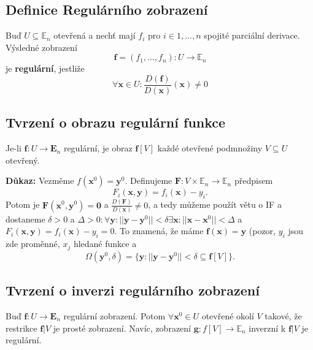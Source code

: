 \documentclass[10pt]{article}
\begin{document}
\subsection{Definice Regulárního zobrazení}
\hspace{1.2mm}
\noindent
Buď $U \subseteq \mathbb{E}_n$ otevřená a nechť mají $f_i$ pro $i \in {1, ... , n}$
spojité parciální derivace. Výsledné zobrazení
\[ \mathbf{f} = (f_1, ... , f_n): U \to \mathbb{E}_n \]
je \textbf{regulární}, jestliže
\[ \forall \mathbf{x} \in U: \frac{D(\mathbf{f})}{D(\mathbf{x})}(\mathbf{x}) \neq 0 \]


\subsection{Tvrzení o obrazu regulární funkce}
\hspace{1.2mm}
\noindent
Je-li $\mathbf{f}: U \to \mathbf{E}_n$ regulární, je obraz $\mathbf{f}[V]$ každé otevřené podmnožiny
$V \subseteq U$ otevřený.

\vspace{5mm}
\noindent
\textbf{Důkaz:} Vezměme $f(\textbf{x}^0) = \textbf{y}^0.$ Definujeme $\textbf{F} : V \times \mathbb{E}_n \rightarrow \mathbb{E}_n$ předpisem
\[F_i(\textbf{x},\textbf{y}) = f_i(\textbf{x}) - y_i.\]
Potom je $\textbf{F}(\textbf{x}^0,\textbf{y}^0) = \textbf{0}$
a $\frac{D(\textbf{F})}{D(\textbf{x})} \neq 0$, 
a tedy můžeme použít větu o IF a dostaneme 
$\delta > 0$ a $\Delta > 0 : \forall \textbf{y} : ||\textbf{y} - \textbf{y}^0|| < \delta \exists \textbf{x} : ||\textbf{x} - \textbf{x}^0|| < \Delta$ a 
$F_i(\textbf{x},\textbf{y}) = f_i(\textbf{x}) - y_i = 0$. To znamená, že máme $\textbf{f}(\textbf{x}) = \textbf{y}$ (pozor, $y_i$ jsou zde proměnné, $x_j$ hledané funkce a
\[\Omega(\textbf{y}^0,\delta) = \{\textbf{y} : ||\textbf{y} - \textbf{y}^0 || < \delta \subseteq \textbf{f}[V]\}.\]

\subsection{Tvrzení o inverzi regulárního zobrazení}
\hspace{1.2mm}
\noindent
Buď $\mathbf{f}: U \to \mathbf{E}_n$ regulární zobrazení. Potom $\forall \mathbf{x}^0 \in U$
otevřené okolí $V$ takové, že restrikce $\mathbf{f}|V$ je prosté zobrazení. Navíc, zobrazení
$\mathbf{g}: f[V] \to \mathbb{E}_n$ inverzní k $\mathbf{f}|V$ je regulární.
\end{document}
